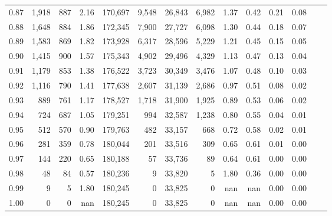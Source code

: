 \begin{tabular}{rrrrrrrrrrrrrr}
0.87 &  1,918 &  887 &    2.16 &  170,697 &    9,548 &  26,843 &   6,982 &  1.37 &  0.42 &  0.21 &      0.08 \\
0.88 &  1,648 &  884 &    1.86 &  172,345 &    7,900 &  27,727 &   6,098 &  1.30 &  0.44 &  0.18 &      0.07 \\
0.89 &  1,583 &  869 &    1.82 &  173,928 &    6,317 &  28,596 &   5,229 &  1.21 &  0.45 &  0.15 &      0.05 \\
0.90 &  1,415 &  900 &    1.57 &  175,343 &    4,902 &  29,496 &   4,329 &  1.13 &  0.47 &  0.13 &      0.04 \\
0.91 &  1,179 &  853 &    1.38 &  176,522 &    3,723 &  30,349 &   3,476 &  1.07 &  0.48 &  0.10 &      0.03 \\
0.92 &  1,116 &  790 &    1.41 &  177,638 &    2,607 &  31,139 &   2,686 &  0.97 &  0.51 &  0.08 &      0.02 \\
0.93 &    889 &  761 &    1.17 &  178,527 &    1,718 &  31,900 &   1,925 &  0.89 &  0.53 &  0.06 &      0.02 \\
0.94 &    724 &  687 &    1.05 &  179,251 &      994 &  32,587 &   1,238 &  0.80 &  0.55 &  0.04 &      0.01 \\
0.95 &    512 &  570 &    0.90 &  179,763 &      482 &  33,157 &     668 &  0.72 &  0.58 &  0.02 &      0.01 \\
0.96 &    281 &  359 &    0.78 &  180,044 &      201 &  33,516 &     309 &  0.65 &  0.61 &  0.01 &      0.00 \\
0.97 &    144 &  220 &    0.65 &  180,188 &       57 &  33,736 &      89 &  0.64 &  0.61 &  0.00 &      0.00 \\
0.98 &     48 &   84 &    0.57 &  180,236 &        9 &  33,820 &       5 &  1.80 &  0.36 &  0.00 &      0.00 \\
0.99 &      9 &    5 &    1.80 &  180,245 &        0 &  33,825 &       0 &   nan &   nan &  0.00 &      0.00 \\
1.00 &      0 &    0 &     nan &  180,245 &        0 &  33,825 &       0 &   nan &   nan &  0.00 &      0.00 \\
\bottomrule
\end{tabular}
